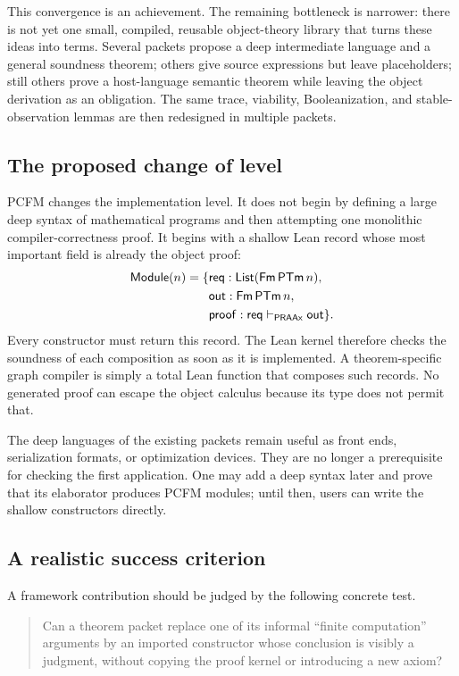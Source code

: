 This convergence is an achievement.  The remaining bottleneck is narrower:
there is not yet one small, compiled, reusable object-theory library that turns
these ideas into  terms.  Several packets propose a deep
intermediate language and a general soundness theorem; others give source
expressions but leave placeholders; still others prove a host-language
semantic theorem while leaving the object derivation as an obligation.  The
same trace, viability, Booleanization, and stable-observation lemmas are then
redesigned in multiple packets.

\subsection{The proposed change of level}

PCFM changes the implementation level.  It does not begin by defining a large
deep syntax of mathematical programs and then attempting one monolithic
compiler-correctness proof.  It begins with a shallow Lean record whose most
important field is already the object proof:
\[
\begin{split}
\mathsf{Module}(n)=\{&
  \mathsf{req}:\mathsf{List}(\mathsf{Fm}\,\mathsf{PTm}\,n),\\
 &\mathsf{out}:\mathsf{Fm}\,\mathsf{PTm}\,n,\\
 &\mathsf{proof}:\mathsf{req}\vdash_{\mathsf{PRAAx}}\mathsf{out}\}.
\end{split}
\]
Every constructor must return this record.  The Lean kernel therefore checks
the soundness of each composition as soon as it is implemented.  A
theorem-specific graph compiler is simply a total Lean function that composes
such records.  No generated proof can escape the object calculus because its
type does not permit that.

The deep languages of the existing packets remain useful as front ends,
serialization formats, or optimization devices.  They are no longer a
prerequisite for checking the first application.  One may add a deep syntax
later and prove that its elaborator produces PCFM modules; until then, users
can write the shallow constructors directly.

\subsection{A realistic success criterion}

A framework contribution should be judged by the following concrete test.

\begin{quote}
Can a theorem packet replace one of its informal ``finite computation''
arguments by an imported constructor whose conclusion is visibly a
 judgment, without copying the proof kernel or introducing a
new axiom?
\end{quote}

